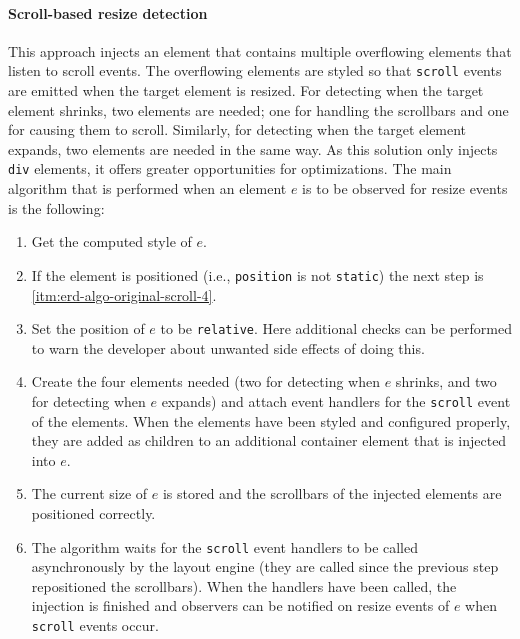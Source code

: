 \documentclass{acm_proc_article-sp}
\newcommand{\code}[1]{\texttt{#1}}
\newcommand{\gls}[1]{#1}
\begin{document}
    \paragraph{Scroll-based resize detection}
    This approach injects an \gls{element} that contains multiple overflowing elements that listen to scroll events.
    The overflowing elements are styled so that \code{scroll} events are emitted when the target \gls{element} is resized.
    For detecting when the target \gls{element} shrinks, two elements are needed; one for handling the scrollbars and one for causing them to scroll.
    Similarly, for detecting when the target \gls{element} expands, two elements are needed in the same way.
    As this solution only injects \code{div} elements, it offers greater opportunities for optimizations.
    The main algorithm that is performed when an element $e$ is to be observed for resize events is the following:
    \begin{enumerate}
      \item\label{itm:erd-algo-original-scroll-1} Get the computed style of $e$.
      \item\label{itm:erd-algo-original-scroll-2} If the element is positioned (i.e., \code{position} is not \code{static}) the next step is \ref{itm:erd-algo-original-scroll-4}.
      \item\label{itm:erd-algo-original-scroll-3} Set the position of $e$ to be \code{relative}. Here additional checks can be performed to warn the developer about unwanted side effects of doing this.
      \item\label{itm:erd-algo-original-scroll-4} Create the four elements needed (two for detecting when $e$ shrinks, and two for detecting when $e$ expands) and attach event handlers for the \code{scroll} event of the elements.
                                                  When the elements have been styled and configured properly, they are added as children to an additional container element that is injected into $e$.
      \item\label{itm:erd-algo-original-scroll-5} The current size of $e$ is stored and the scrollbars of the injected elements are positioned correctly.
      \item\label{itm:erd-algo-original-scroll-6} The algorithm waits for the \code{scroll} event handlers to be called asynchronously by the \gls{layout engine} (they are called since the previous step repositioned the scrollbars).
                                                  When the handlers have been called, the injection is finished and observers can be notified on resize events of $e$ when \code{scroll} events occur.
    \end{enumerate}
\end{document}

